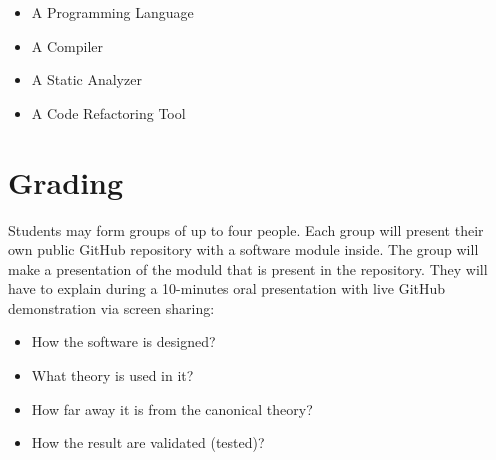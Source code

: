 \documentclass[nobrand,anonymous,nodate,nosecurity]{huawei}
\begin{document}
{\begin{itemize}
\item A Programming Language
\item A Compiler
\item A Static Analyzer
\item A Code Refactoring Tool
\end{itemize}










\newpage
\section*{Grading}

Students may form groups of up to four people. Each group will present
their own public GitHub repository with a software module inside. The group
will make a presentation of the moduld that is
present in the repository. They will have to explain during a 10-minutes
oral presentation with live GitHub demonstration via screen sharing:

\begin{itemize}
	\item How the software is designed?
	\item What theory is used in it?
	\item How far away it is from the canonical theory?
	\item How the result are validated (tested)?
\end{itemize}

}
\end{document}
